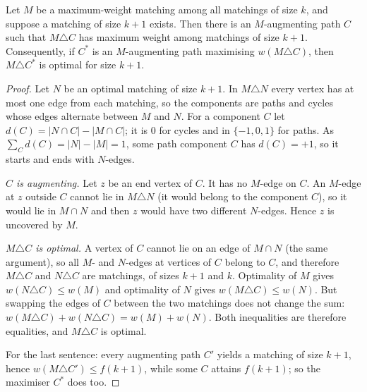 \documentclass[11pt]{article}
\begin{document}
\begin{theorembox}
Let $M$ be a maximum-weight matching among all matchings of size $k$, and
suppose a matching of size $k+1$ exists. Then there is an $M$-augmenting
path $C$ such that $M\triangle C$ has maximum weight among matchings of
size $k+1$. Consequently, if $C^*$ is an $M$-augmenting path maximising
$w(M\triangle C)$, then $M\triangle C^*$ is optimal for size $k+1$.
\end{theorembox}
\begin{proof}
Let $N$ be an optimal matching of size $k+1$. In $M\triangle N$ every
vertex has at most one edge from each matching, so the components are
paths and cycles whose edges alternate between $M$ and $N$. For a
component $C$ let $d(C)=|N\cap C|-|M\cap C|$; it is $0$ for cycles
and in $\{-1,0,1\}$ for paths. As $\sum_Cd(C)=|N|-|M|=1$, some path
component $C$ has $d(C)=+1$, so it starts and ends with $N$-edges.

\emph{$C$ is augmenting.} Let $z$ be an end vertex of $C$. It has no
$M$-edge on $C$. An $M$-edge at $z$ outside $C$ cannot lie in $M\triangle N$
(it would belong to the component $C$), so it would lie in $M\cap N$ and
then $z$ would have two different $N$-edges. Hence $z$ is uncovered by
$M$.

\emph{$M\triangle C$ is optimal.} A vertex of $C$ cannot lie on an edge of
$M\cap N$ (the same argument), so all $M$- and $N$-edges at vertices of
$C$ belong to $C$, and therefore $M\triangle C$ and $N\triangle C$ are
matchings, of sizes $k+1$ and $k$. Optimality of $M$ gives
$w(N\triangle C)\le w(M)$ and optimality of $N$ gives
$w(M\triangle C)\le w(N)$. But swapping the edges of $C$ between the two
matchings does not change the sum:
$w(M\triangle C)+w(N\triangle C)=w(M)+w(N)$. Both inequalities are
therefore equalities, and $M\triangle C$ is optimal.

For the last sentence: every augmenting path $C'$ yields a matching of
size $k+1$, hence $w(M\triangle C')\le f(k+1)$, while some $C$
attains $f(k+1)$; so the maximiser $C^*$ does too.
\end{proof}
\end{document}
